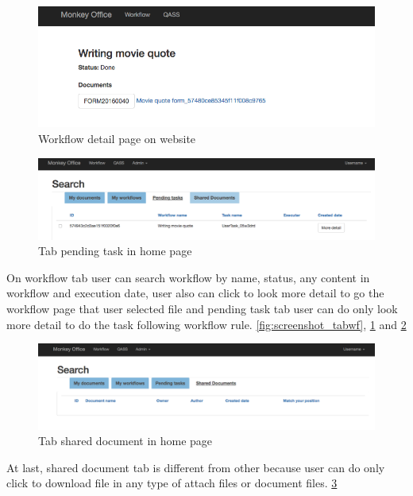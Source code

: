 \begin{figure}[h!]

	\centering
	\caption{Workflow detail page on website}
	\label{fig:screenshot_wfdetail}
	\includegraphics[scale=0.3]{res/wf_detail_page}
\end{figure}

\begin{figure}[h!]

	\centering
	\caption{Tab pending task in home page}
	\label{fig:screenshot_pending}	
	\includegraphics[scale=0.3]{res/pending_page}
\end{figure}

 On workflow tab user can search workflow by name, status, any content in workflow and execution date, user also can click to look more detail to go the workflow page that user selected file and pending task tab user can do only look more detail to do the task following workflow rule. \ref{fig:screenshot_tabwf}, \ref{fig:screenshot_wfdetail} and \ref{fig:screenshot_pending}

 \begin{figure}[h!]

	\centering
	\caption{Tab shared document in home page}
	\label{fig:screenshot_shared}
	\includegraphics[scale=0.3]{res/tab_shared_page}
\end{figure}

At last, shared document tab is different from other because user can do only click to download file in any type of attach files or document files. \ref{fig:screenshot_shared}




